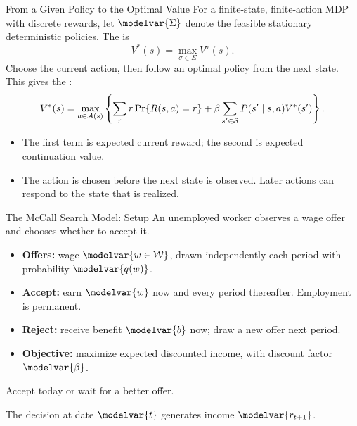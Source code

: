 \begin{frame}{From a Given Policy to the Optimal Value}
For a finite-state, finite-action MDP with discrete rewards, let \(\modelvar{\Sigma}\) denote the feasible stationary deterministic policies. The  is
\[V^*(s)=\max_{\sigma\in\Sigma}V^\sigma(s).\]
Choose the current action, then follow an optimal policy from the next state. This gives the :
\[V^*(s)=\max_{a\in\mathcal A(s)}
 \left\{\sum_r r\Pr\{R(s,a)=r\}+\beta\sum_{s'\in\mathcal S}P(s'\mid s,a)V^*(s')\right\}.\]
\begin{itemize}
\item The first term is expected current reward; the second is expected continuation value.
\item The action is chosen before the next state is observed. Later actions can respond to the state that is realized.
\end{itemize}
\end{frame}

\begin{frame}{The McCall Search Model: Setup}
An unemployed worker observes a wage offer and chooses whether to accept it.
\begin{itemize}
\item \textbf{Offers:} wage \(\modelvar{w\in\mathcal W}\), drawn independently each period with probability \(\modelvar{q(w)}\).
\item \textbf{Accept:} earn \(\modelvar{w}\) now and every period thereafter. Employment is permanent.
\item \textbf{Reject:} receive benefit \(\modelvar{b}\) now; draw a new offer next period.
\item \textbf{Objective:} maximize expected discounted income, with discount factor \(\modelvar{\beta}\).
\end{itemize}
Accept today or wait for a better offer.
\par\medskip
\small The decision at date \(\modelvar{t}\) generates income \(\modelvar{r_{t+1}}\).
\end{frame}

